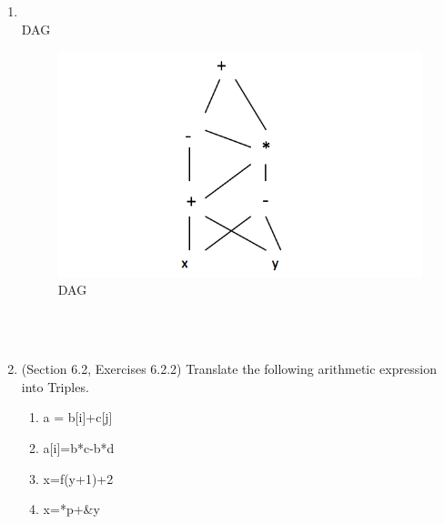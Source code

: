 \documentclass[12pt,a4paper]{article}
\makeatletter
\newtheorem*{solution}{Solution}
\renewenvironment{solution}[1][Solution] {\par\pushQED{\qed}\normalfont\topsep6\p@\@plus6\p@\relax\trivlist\item[\hskip\labelsep\bfseries#1\@addpunct{.}]\ignorespaces}{\popQED\endtrivlist\@endpefalse} \makeatother
\makeatother
\begin{document}
\begin{enumerate}
\begin{solution}
    \textrm{\\}
    DAG
    \begin{figure}[h]
    \center
    \includegraphics[width=0.8\linewidth]{sol}\vspace{-10pt}
    \caption{DAG} \label{DAG}\vspace{-10pt}
    \end{figure}

\end{solution}

\textrm{\\}
\newpage
\textrm{\\}
\item (Section 6.2, Exercises 6.2.2) Translate the following arithmetic expression into Triples.

    \begin{enumerate}
    \item a = b[i]+c[j]
    \item a[i]=b*c-b*d
    \item x=f(y+1)+2
    \item x=*p+\&y
    \end{enumerate}


\end{enumerate}
\end{document}
